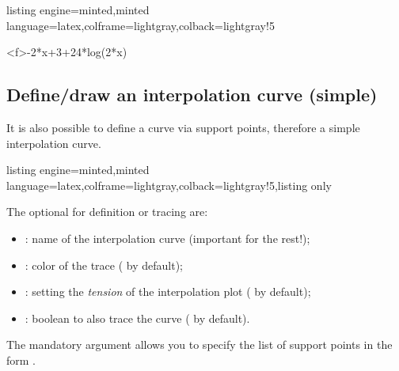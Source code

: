 \documentclass[11pt,a4paper]{ltxdoc}
\begin{document}
\begin{tcblisting}{listing engine=minted,minted language=latex,colframe=lightgray,colback=lightgray!5}
\begin{GraphTikz}%
	[x=0.9cm,y=0.425cm,Xmin=4,Xmax=20,Origx=4,
	Ymin=40,Ymax=56,Ygrid=2,Ygrids=1,Origy=40]
	{-2*x+3+24*log(2*x)}
\end{GraphTikz}
\end{tcblisting}

\pagebreak

\subsection{Define/draw an interpolation curve (simple)}\label{deftracinterpo}

It is also possible to define a curve via support points, therefore a simple interpolation curve.

\begin{tcblisting}{listing engine=minted,minted language=latex,colframe=lightgray,colback=lightgray!5,listing only}
\end{tcblisting}

The optional \MontreCode{[keys]} for definition or tracing are:

\smallskip

\begin{itemize}
	\item {}: name of the interpolation curve (important for the rest!);
	\item {}: color of the trace ( by default);
	\item {}: setting the \textit{tension} of the interpolation plot ( by default);
	\item {}: boolean to also trace the curve ( by default).
\end{itemize}

The mandatory argument allows you to specify the list of support points in the form .
\end{document}
